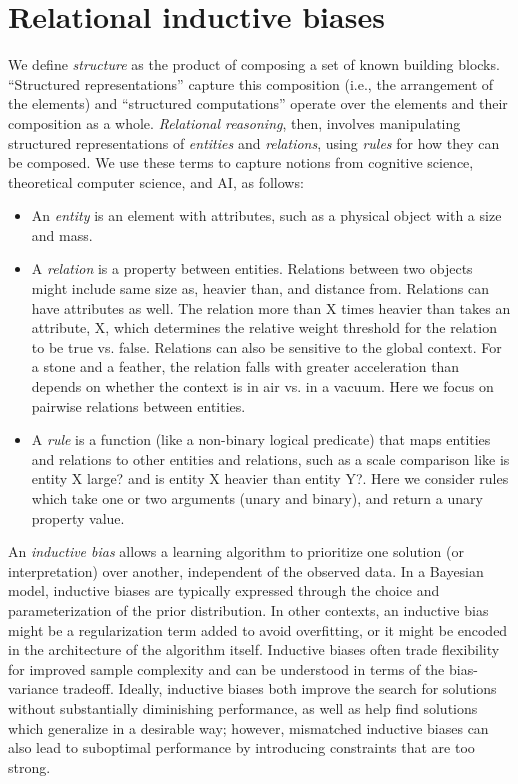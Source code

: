\documentclass[10pt]{book}
\let\defaultmarginpar\marginpar
\renewcommand\marginpar[2][]{\defaultmarginpar{\itshape\color{gray}#2}}
\begin{document}
\section{Relational inductive biases}

We define \emph{structure} as the product of composing a set of known building blocks. ``Structured representations'' capture this composition (i.e., the arrangement of the elements) and ``structured computations'' operate over the elements and their composition as a whole. \emph{Relational reasoning}\marginpar{relational reasoning},
then, involves manipulating structured representations of \emph{entities} and \emph{relations}, using \emph{rules} for how they can be composed. We use these terms to capture notions from cognitive science, theoretical computer science, and AI, as follows:
\begin{itemize}
    \item An \emph{entity}\marginpar{entity} is an element with attributes, such as a physical object with a size and mass.
    \item A \emph{relation}\marginpar{relation} is a property between entities. Relations between two objects might include same size as, heavier than, and distance from. Relations can have attributes as well. The relation more than X times heavier than takes an attribute, X, which determines the relative weight threshold for the relation to be true vs. false. Relations can also be sensitive to the global context. For a stone and a feather, the relation falls with greater acceleration than depends on whether the context is in air vs. in a vacuum. Here we focus on pairwise relations between entities.
    \item A \emph{rule}\marginpar{rule} is a function (like a non-binary logical predicate) that maps entities and relations to other entities and relations, such as a scale comparison like is entity X large? and is entity X heavier than entity Y?. Here we consider rules which take one or two arguments (unary and binary), and return a unary property value.
\end{itemize}

An \emph{inductive bias}\marginpar{inductive bias} allows a learning algorithm to prioritize one solution (or interpretation) over another, independent of the observed data. In a Bayesian model, inductive biases are typically expressed through the choice and parameterization of the prior distribution. In other contexts, an inductive bias might be a regularization term added to avoid overfitting, or it might be encoded in the architecture of the algorithm itself. Inductive biases often trade flexibility for improved sample complexity and can be understood in terms of the bias-variance tradeoff. Ideally, inductive biases both improve the search for solutions without substantially diminishing performance, as well as help find solutions which generalize in a desirable way; however, mismatched inductive biases can also lead to suboptimal performance by introducing constraints that are too strong.
\end{document}
